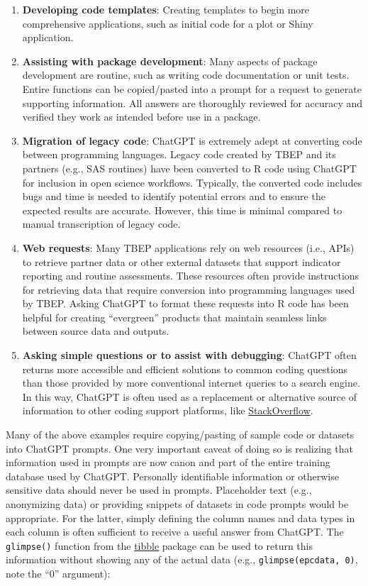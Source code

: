 \documentclass[
]{book}
\providecommand{\tightlist}{%
  \setlength{\itemsep}{0pt}\setlength{\parskip}{0pt}}
\begin{document}
\begin{enumerate}
\def\labelenumi{\arabic{enumi}.}
\tightlist
\item
  \textbf{Developing code templates}: Creating templates to begin more comprehensive applications, such as initial code for a plot or Shiny application.
\item
  \textbf{Assisting with package development}: Many aspects of package development are routine, such as writing code documentation or unit tests. Entire functions can be copied/pasted into a prompt for a request to generate supporting information. All answers are thoroughly reviewed for accuracy and verified they work as intended before use in a package.
\item
  \textbf{Migration of legacy code}: ChatGPT is extremely adept at converting code between programming languages. Legacy code created by TBEP and its partners (e.g., SAS routines) have been converted to R code using ChatGPT for inclusion in open science workflows. Typically, the converted code includes bugs and time is needed to identify potential errors and to ensure the expected results are accurate. However, this time is minimal compared to manual transcription of legacy code.
\item
  \textbf{Web requests}: Many TBEP applications rely on web resources (i.e., APIs) to retrieve partner data or other external datasets that support indicator reporting and routine assessments. These resources often provide instructions for retrieving data that require conversion into programming languages used by TBEP. Asking ChatGPT to format these requests into R code has been helpful for creating ``evergreen'' products that maintain seamless links between source data and outputs.\\
\item
  \textbf{Asking simple questions or to assist with debugging}: ChatGPT often returns more accessible and efficient solutions to common coding questions than those provided by more conventional internet queries to a search engine. In this way, ChatGPT is often used as a replacement or alternative source of information to other coding support platforms, like \href{https://stackoverflow.com/}{StackOverflow}.
\end{enumerate}

Many of the above examples require copying/pasting of sample code or datasets into ChatGPT prompts. One very important caveat of doing so is realizing that information used in prompts are now canon and part of the entire training database used by ChatGPT. Personally identifiable information or otherwise sensitive data should never be used in prompts. Placeholder text (e.g., anonymizing data) or providing snippets of datasets in code prompts would be appropriate. For the latter, simply defining the column names and data types in each column is often sufficient to receive a useful answer from ChatGPT. The \texttt{glimpse()} function from the \href{https://tibble.tidyverse.org/}{tibble} package can be used to return this information without showing any of the actual data (e.g., \texttt{glimpse(epcdata,\ 0)}, note the ``0'' argument):
\end{document}
